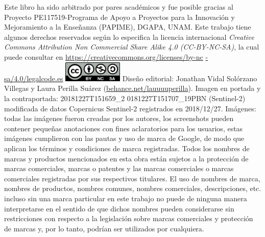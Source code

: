 \vspace*{\fill}

\newpage

\setlength{\columnsep}{25pt}
\begin{multicols*}{2}
    \raggedcolumns
    {\scriptsize Este libro ha sido arbitrado por pares académicos y fue posible gracias al Proyecto PE117519-Programa de Apoyo a Proyectos para la Innovación y Mejoramiento a la Enseñanza (PAPIME), DGAPA, UNAM. 
    \linebreak Este trabajo tiene algunos derechos reservados según lo especifica la licencia internacional {\it Creative Commons Attribution Non Commercial Share Alike 4.0 (CC-BY-NC-SA)}, la cual puede consultar en \href{https://creativecommons.org/licenses/by-nc-sa/4.0/legalcode.es}{https://creativecommons.org/licenses/by-nc} \href{https://creativecommons.org/licenses/by-nc -sa/4.0/legalcode.es}{-sa/4.0/legalcode.es}
    \linebreak
    \linebreak
    \begingroup
        \includegraphics[height=28pt]{Img/license}
    \endgroup
    \newline Diseño editorial: Jonathan Vidal Solórzano Villegas y Laura Perilla Suárez (\href{https://behance.net/lauuuuperilla}{behance.net/lauuuuperilla}).
    \newline Imagen en portada y la contraportada: 20181227T151659\_2 0181227T151707\_19PBN (Sentinel-2) modificada de datos Copernicus Sentinel-2 registrados en 2018/12/27. 
    \newline Imágenes: todas las imágenes fueron creadas por los autores, los screenshots pueden contener pequeñas anotaciones con fines aclaratorios para los usuarios, estas imágenes cumplieron con las pautas y uso de marca de Google, de modo que aplican los términos y condiciones de marca registradas. 
    \newline Todos los nombres de marcas y productos mencionados en esta obra están sujetos a la protección de marcas comerciales, marcas o patentes y las marcas comerciales o marcas comerciales registradas por sus respectivos titulares. 
    El uso de nombres de marca, nombres de productos, nombres comunes, nombres comerciales, descripciones, etc. incluso sin una marca particular en este trabajo no puede de ninguna manera interpretarse en el sentido de que dichos nombres pueden considerarse sin restricciones con respecto a la legislación sobre marcas comerciales y protección de marcas y, por lo tanto, podrían ser utilizados por cualquiera.
}
\end{multicols*}
